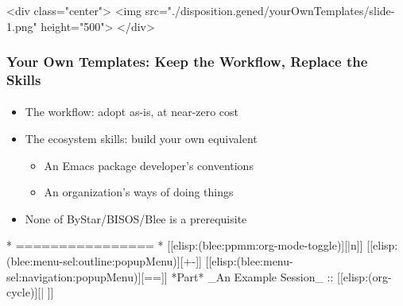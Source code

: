 \begin{whenOrg}
\begin{htmlonly}

\begin{frame}[fragile,plain,label=yourOwnTemplates]
    \frametitle{}
    \framesubtitle{}
    \begin{rawhtml}
<div class="center">
<img src="./disposition.gened/yourOwnTemplates/slide-1.png" height="500">
</div>
    \end{rawhtml}
\end{frame}
\end{htmlonly}

\begin{verblatex}

\begin{frame}[fragile,plain,label=yourOwnTemplates]
    \frametitle{Your Own Templates: Keep the Workflow, Replace the Skills}
    \framesubtitle{}

\begin{itemize}
  \item The workflow: adopt as-is, at near-zero cost
  \item The ecosystem skills: build your own equivalent
    \begin{itemize}
    \item An Emacs package developer's conventions
    \item An organization's ways of doing things
    \end{itemize}
  \item None of ByStar/BISOS/Blee is a prerequisite
  \end{itemize}


\end{frame}
\end{verblatex}



\begin{whenOrg}
*      ================
*  [[elisp:(blee:ppmm:org-mode-toggle)][|n]] [[elisp:(blee:menu-sel:outline:popupMenu)][+-]] [[elisp:(blee:menu-sel:navigation:popupMenu)][==]]  *Part*   _An Example Session_ ::  [[elisp:(org-cycle)][| ]]
\end{whenOrg}


\end{whenOrg}
